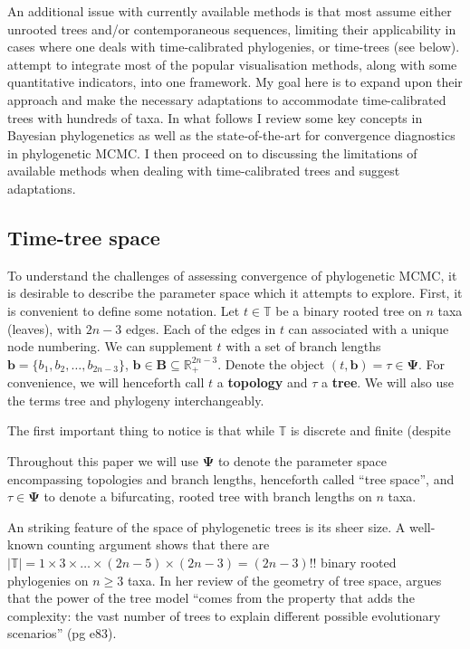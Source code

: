An additional issue with currently available methods is that most assume either unrooted trees and/or contemporaneous sequences, limiting their applicability in cases where one deals with time-calibrated phylogenies, or time-trees (see below).
\cite{Warren2017} attempt to integrate most of the popular visualisation methods, along with some quantitative indicators, into one framework.
My goal here is to expand upon their approach and make the necessary adaptations to accommodate time-calibrated trees with hundreds of taxa.
In what follows I review  some key concepts in Bayesian phylogenetics as well as the state-of-the-art for convergence diagnostics in phylogenetic MCMC.
I then proceed on to discussing the limitations of available methods when dealing with time-calibrated trees and suggest adaptations.

\subsection{Time-tree space}
\label{sec:ttspace}

To understand the challenges of assessing convergence of phylogenetic MCMC, it is desirable to describe the parameter space which it attempts to explore.
First, it is convenient to define some notation.
Let $t \in \mathbb{T}$ be a binary rooted tree on $n$ taxa (leaves), with $2n-3$ edges.
Each of the edges in $t$ can associated with a unique node numbering.
We can supplement $t$ with a set of branch lengths $\boldsymbol b = \{b_1, b_2, \ldots, b_{2n-3} \}$, $\boldsymbol b \in \boldsymbol B \subseteq \mathbb{R}_{+}^{2n-3}$.
Denote the object $(t, \boldsymbol b) = \tau \in \boldsymbol\Psi$. 
For convenience, we will henceforth call $t$ a \textbf{topology} and $\tau$ a \textbf{tree}.
We will also use the terms tree and phylogeny interchangeably.

The first important thing to notice is that while $\mathbb{T}$ is discrete and finite (despite 

Throughout this paper we will use $\boldsymbol\Psi$ to denote the parameter space encompassing topologies and branch lengths, henceforth called ``tree space'', and $\tau \in \boldsymbol\Psi$ to denote a bifurcating, rooted tree with branch lengths on  $n$ taxa.


An striking feature of the space of phylogenetic trees is its sheer size.
A well-known counting argument shows that there are $ |\mathbb{T}| = 1 \times 3 \times \ldots \times (2n-5) \times (2n-3) = (2n-3)!!$ binary rooted phylogenies on $n \geq 3$ taxa.
In her review of the geometry of tree space, \cite{StJohn2017} argues that the power of the tree model ``comes from the property that adds the complexity: the vast number of trees to explain different possible evolutionary scenarios'' (pg e83).


